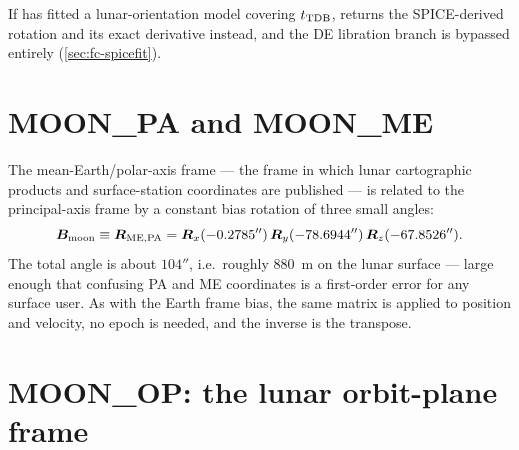 \begin{lupntnote}
  If  has fitted a lunar-orientation model
  covering $t_{\mathrm{TDB}}$,  returns the
  SPICE-derived rotation and its exact derivative instead, and the DE
  libration branch is bypassed entirely (\cref{sec:fc-spicefit}).
\end{lupntnote}

\section{MOON\_PA and MOON\_ME}
\label{sec:fc-moonme}

The mean-Earth/polar-axis frame  --- the frame in which lunar
cartographic products and surface-station coordinates are published --- is
related to the principal-axis frame by a constant bias rotation of three
small angles:
%
\begin{equation}
  \label{eq:fc-moonme}
  \bm{B}_{\mathrm{moon}} \equiv \bm{R}_{\mathrm{ME},\mathrm{PA}}
  = \bm{R}_x(-0.2785'')\,\bm{R}_y(-78.6944'')\,\bm{R}_z(-67.8526'') .
\end{equation}
%
The total angle is about $104''$, i.e.\ roughly \SI{880}{\meter} on the
lunar surface --- large enough that confusing PA and ME coordinates is a
first-order error for any surface user. As with the Earth frame bias, the
same matrix is applied to position and velocity, no epoch is needed, and the
inverse is the transpose.

\section{MOON\_OP: the lunar orbit-plane frame}
\label{sec:fc-moonop}

